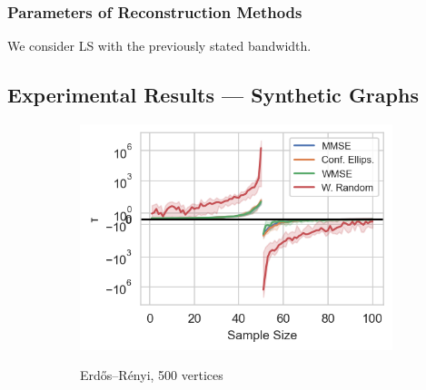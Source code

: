 \subsubsection{Parameters of Reconstruction Methods} We consider LS with the previously stated bandwidth.

\subsection{Experimental Results --- Synthetic Graphs}

\begin{figure}
    \centering
    \begin{subfigure}{0.3\columnwidth}
    \resizebox{\width}{0.62\columnwidth}
    {\includegraphics[width=\columnwidth]{figures/proj1/plots/LS_threshold/ER_0pt8_500_bandwidth_50_thresholds_LS.png}}
    \caption{Erdős–Rényi, 500 vertices} 
    \label{snr_ER}
    \end{subfigure}
    \hfill
    \begin{subfigure}{0.3\columnwidth}

\end{subfigure}
\end{figure}

